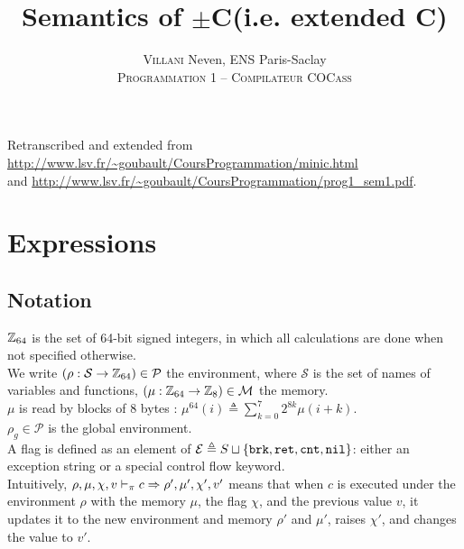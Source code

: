 

\newcommand{\Cmp}{\(\pm\)C}
\newcommand{\Cmm}{C\textminus\textminus}
\newcommand{\fun}{\text{fun}_\pi^n}
\newcommand{\fnptr}{\text{fun}_\mu^n}
\newcommand{\gives}{\vdash_\pi}
\newcommand{\brk}{\t{brk}}
\newcommand{\ret}{\t{ret}}
\newcommand{\cnt}{\t{cnt}}
\newcommand{\nil}{\t{nil}}

\title{Semantics of \Cmp (i.e. extended \Cmm)}
\author{\textsc{Villani} Neven, ENS Paris-Saclay\\\textsc{Programmation 1 -- Compilateur COCass}}


\maketitle

Retranscribed and extended from \url{http://www.lsv.fr/~goubault/CoursProgrammation/minic.html}\\
and \url{http://www.lsv.fr/~goubault/CoursProgrammation/prog1_sem1.pdf}.\\


\section{Expressions}

\subsection*{Notation}

\(\mathbb{Z}_{64}\) is the set of 64-bit signed integers, in which all calculations are done when not specified otherwise.\\

We write \((\rho: \mathcal{S}\to\mathbb{Z}_{64})\in \mathcal{P}\) the environment, where \(\mathcal{S}\) is the set of names of variables and functions, \((\mu: \mathbb{Z}_{64}\to\mathbb{Z}_{8})\in \mathcal{M}\) the memory.\\
\(\mu\) is read by blocks of 8 bytes : \(\mu^{64}(i) \triangleq \sum_{k=0}^7 2^{8k}\mu(i+k)\).\\
\(\rho_g\in\mathcal{P}\) is the global environment.\\

A flag is defined as an element of \(\mathcal{E} \triangleq S \sqcup \{ \brk, \ret, \cnt, \nil \}\): either an exception string or a special control flow keyword.\\
Intuitively, \(\rho,\mu,\chi,v \gives c \tto \rho',\mu',\chi',v'\) means that when \(c\) is executed under the environment \(\rho\) with the memory \(\mu\), the flag \(\chi\), and the previous value \(v\), it updates it to the new environment and memory \(\rho'\) and \(\mu'\), raises \(\chi'\), and changes the value to \(v'\).\\

